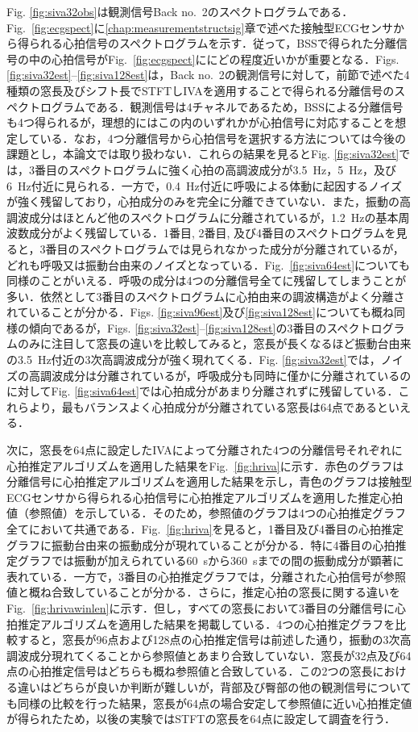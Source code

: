 Fig. \ref{fig:siva32obs}は観測信号Back no.~2のスペクトログラムである．Fig.~\ref{fig:ecgspect}に\ref{chap:measurementstructsig}章で述べた接触型ECGセンサから得られる心拍信号のスペクトログラムを示す．従って，BSSで得られた分離信号の中の心拍信号がFig.~\ref{fig:ecgspect}ににどの程度近いかが重要となる．Figs. \ref{fig:siva32est}--\ref{fig:siva128est}は，Back no.~2の観測信号に対して，前節で述べた4種類の窓長及びシフト長でSTFTしIVAを適用することで得られる分離信号のスペクトログラムである．観測信号は4チャネルであるため，BSSによる分離信号も4つ得られるが，理想的にはこの内のいずれかが心拍信号に対応することを想定している．なお，4つ分離信号から心拍信号を選択する方法については今後の課題とし，本論文では取り扱わない．これらの結果を見るとFig. \ref{fig:siva32est}では，3番目のスペクトログラムに強く心拍の高調波成分が3.5~Hz，5~Hz，及び6~Hz付近に見られる．一方で，0.4~Hz付近に呼吸による体動に起因するノイズが強く残留しており，心拍成分のみを完全に分離できていない．また，振動の高調波成分はほとんど他のスペクトログラムに分離されているが，1.2~Hzの基本周波数成分がよく残留している．1番目, 2番目, 及び4番目のスペクトログラムを見ると，3番目のスペクトログラムでは見られなかった成分が分離されているが，どれも呼吸又は振動台由来のノイズとなっている．Fig.~\ref{fig:siva64est}についても同様のことがいえる．呼吸の成分は4つの分離信号全てに残留してしまうことが多い．依然として3番目のスペクトログラムに心拍由来の調波構造がよく分離されていることが分かる．Figs. \ref{fig:siva96est}及び\ref{fig:siva128est}についても概ね同様の傾向であるが，Figs. \ref{fig:siva32est}--\ref{fig:siva128est}の3番目のスペクトログラムのみに注目して窓長の違いを比較してみると，窓長が長くなるほど振動台由来の3.5~Hz付近の3次高調波成分が強く現れてくる．Fig. \ref{fig:siva32est}では，ノイズの高調波成分は分離されているが，呼吸成分も同時に僅かに分離されているのに対してFig. \ref{fig:siva64est}では心拍成分があまり分離されずに残留している．これらより，最もバランスよく心拍成分が分離されている窓長は64点であるといえる．

次に，窓長を64点に設定したIVAによって分離された4つの分離信号それぞれに心拍推定アルゴリズムを適用した結果をFig.~\ref{fig:hriva}に示す．赤色のグラフは分離信号に心拍推定アルゴリズムを適用した結果を示し，青色のグラフは接触型ECGセンサから得られる心拍信号に心拍推定アルゴリズムを適用した推定心拍値（参照値）を示している．そのため，参照値のグラフは4つの心拍推定グラフ全てにおいて共通である．Fig.~\ref{fig:hriva}を見ると，1番目及び4番目の心拍推定グラフに振動台由来の振動成分が現れていることが分かる．特に4番目の心拍推定グラフでは振動が加えられている60~sから360~sまでの間の振動成分が顕著に表れている．一方で，3番目の心拍推定グラフでは，分離された心拍信号が参照値と概ね合致していることが分かる．さらに，推定心拍の窓長に関する違いをFig.~\ref{fig:hrivawinlen}に示す．但し，すべての窓長において3番目の分離信号に心拍推定アルゴリズムを適用した結果を掲載している．4つの心拍推定グラフを比較すると，窓長が96点および128点の心拍推定信号は前述した通り，振動の3次高調波成分現れてくることから参照値とあまり合致していない．窓長が32点及び64点の心拍推定信号はどちらも概ね参照値と合致している．この2つの窓長における違いはどちらが良いか判断が難しいが，背部及び臀部の他の観測信号についても同様の比較を行った結果，窓長が64点の場合安定して参照値に近い心拍推定値が得られたため，以後の実験ではSTFTの窓長を64点に設定して調査を行う．


